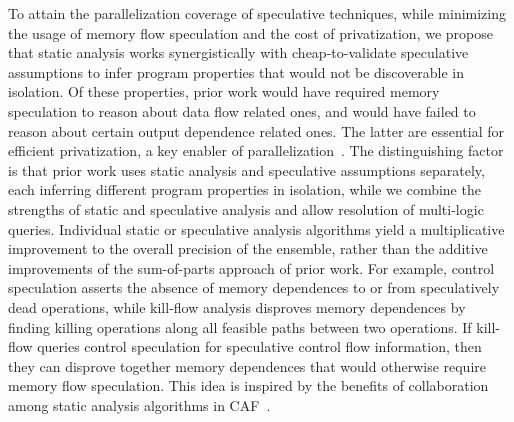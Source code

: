 To attain the parallelization coverage of speculative techniques, while
minimizing the usage of memory flow speculation and the cost of privatization,
we propose that static analysis works synergistically with cheap-to-validate
speculative assumptions to infer program properties that would not be
discoverable in isolation.
%
Of these properties, prior work would have required memory speculation to reason
about data flow related ones, and would have failed to reason about certain
output dependence related ones. The latter are essential for efficient
privatization, a key enabler of
parallelization~\cite{7,21,22,29,32_from_privateer}.
%
The distinguishing factor is that prior work uses static analysis and
speculative assumptions separately, each inferring different program properties
in isolation, while we combine the strengths of static and speculative analysis
and allow resolution of multi-logic queries.
%
Individual static or speculative analysis algorithms yield a multiplicative
improvement to the overall precision of the ensemble, rather than the additive
improvements of the sum-of-parts approach of prior work.
%
For example, control speculation asserts the absence of memory dependences to or
from speculatively dead operations, while kill-flow analysis disproves memory
dependences by finding killing operations along all feasible paths between two
operations. If kill-flow queries control speculation for speculative control
flow information, then they can disprove together memory dependences that would
otherwise require memory flow speculation.
%
This idea is inspired by the benefits of collaboration among static analysis
algorithms in CAF~\cite{johnson:17:cgo}.


%
%
%

